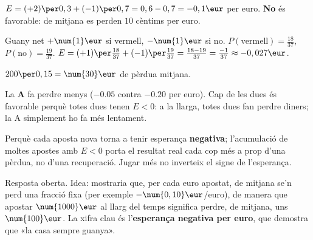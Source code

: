 \begin{solucions}
\begin{sollist}
  \item $E = (+2)\per 0,3 + (-1)\per 0,7 = 0,6 - 0,7 = -0,1\eur$ per euro. \textbf{No}
        és favorable: de mitjana es perden $10$ cèntims per euro.
  \item Guany net $+\num{1}\eur$ si vermell, $-\num{1}\eur$ si no.
        $P(\text{vermell})=\frac{18}{37}$, $P(\text{no})=\frac{19}{37}$.
        $E = (+1)\per\frac{18}{37} + (-1)\per\frac{19}{37}=\frac{18-19}{37}=\frac{-1}{37}\approx -0,027\eur$.
  \item $200\per 0,15 = \num{30}\eur$ de pèrdua mitjana.
  \item La \textbf{A} fa perdre menys ($-\num{0,05}$ contra $-\num{0,20}$ per euro). Cap
        de les dues és favorable perquè totes dues tenen $E<0$: a la llarga, totes dues
        fan perdre diners; la A simplement ho fa més lentament.
  \item Perquè cada aposta nova torna a tenir esperança \textbf{negativa};
        l'acumulació de moltes apostes amb $E<0$ porta el resultat real cada cop més a
        prop d'una pèrdua, no d'una recuperació. Jugar més no inverteix el signe de
        l'esperança.
  \item Resposta oberta. Idea: mostraria que, per cada euro apostat, de mitjana se'n
        perd una fracció fixa (per exemple $-\num{0,10}\eur$/euro), de manera que apostar
        $\num{1000}\eur$ al llarg del temps significa perdre, de mitjana, uns
        $\num{100}\eur$. La xifra clau és l'\textbf{esperança negativa per euro}, que
        demostra que «la casa sempre guanya».
\end{sollist}
\end{solucions}
